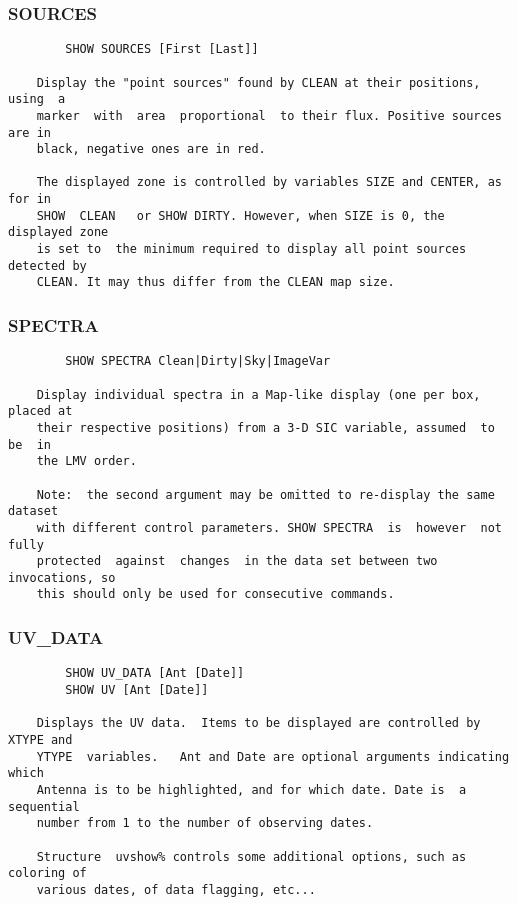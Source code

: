 \subsubsection{SOURCES}
\begin{verbatim}
        SHOW SOURCES [First [Last]]

    Display the "point sources" found by CLEAN at their positions,  using  a
    marker  with  area  proportional  to their flux. Positive sources are in
    black, negative ones are in red.

    The displayed zone is controlled by variables SIZE and CENTER, as for in
    SHOW  CLEAN   or SHOW DIRTY. However, when SIZE is 0, the displayed zone
    is set to  the minimum required to display all point sources detected by
    CLEAN. It may thus differ from the CLEAN map size.

\end{verbatim}
\subsubsection{SPECTRA}
\begin{verbatim}
        SHOW SPECTRA Clean|Dirty|Sky|ImageVar

    Display individual spectra in a Map-like display (one per box, placed at
    their respective positions) from a 3-D SIC variable, assumed  to  be  in
    the LMV order.

    Note:  the second argument may be omitted to re-display the same dataset
    with different control parameters. SHOW SPECTRA  is  however  not  fully
    protected  against  changes  in the data set between two invocations, so
    this should only be used for consecutive commands.

\end{verbatim}
\subsubsection{UV\_DATA}
\begin{verbatim}
        SHOW UV_DATA [Ant [Date]]
        SHOW UV [Ant [Date]]

    Displays the UV data.  Items to be displayed are controlled by XTYPE and
    YTYPE  variables.   Ant and Date are optional arguments indicating which
    Antenna is to be highlighted, and for which date. Date is  a  sequential
    number from 1 to the number of observing dates.

    Structure  uvshow% controls some additional options, such as coloring of
    various dates, of data flagging, etc...

\end{verbatim}
